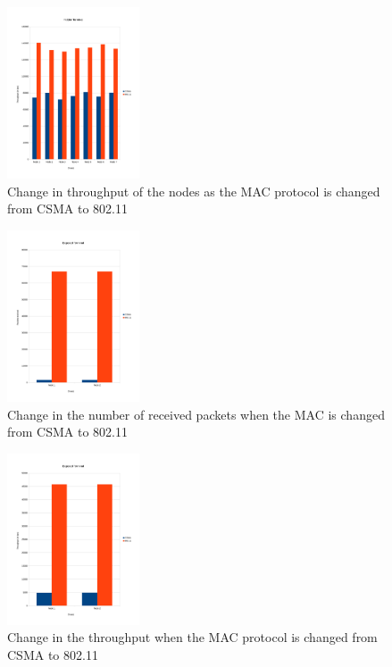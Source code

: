 \begin{figure}[t]
  \centering
  \includegraphics[width=0.35\textwidth, scale=0.35]{figures/hidden_thrput.pdf}
  \caption{Change in throughput of the nodes as the MAC protocol is changed from CSMA to 802.11}
  \label{fig:overhead}
\end{figure}

\begin{figure}[t]
  \centering
  \includegraphics[width=0.35\textwidth, scale=0.35]{figures/exposed_recvPkts.pdf}
  \caption{Change in the number of received packets when the MAC is changed from CSMA to 802.11}
  \label{fig:setup}
\end{figure}

\begin{figure}[t]
  \centering
  \includegraphics[width=0.35\textwidth, scale=0.35]{figures/exposed_thrput.pdf}
  \caption{Change in the throughput when the MAC protocol is changed from CSMA to 802.11}
  \label{fig:overhead}
\end{figure}

